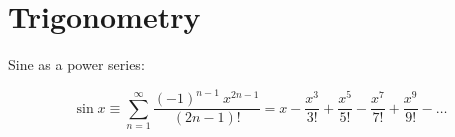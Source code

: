\section{Trigonometry}
\label{sec:trig}

Sine as a power series:

\begin{equation}
    \sin x \equiv \sum_{n = 1}^{\infty} \frac{(-1)^{n - 1} \ x^{2n - 1}}{(2n - 1)!} = x - \frac{x^3}{3!} + \frac{x^5}{5!} - \frac{x^7}{7!} + \frac{x^9}{9!} - \dots
\end{equation}
